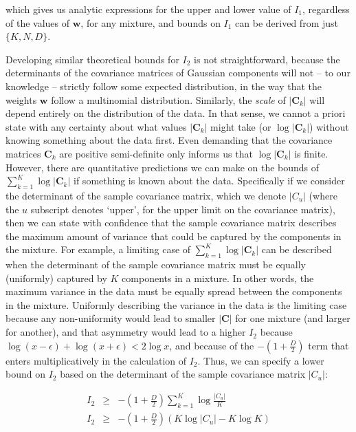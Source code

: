 \documentclass{elsarticle}
\newcommand{\vect}[1]{\boldsymbol{\mathbf{#1}}}
\renewcommand{\vec}[1]{\vect{#1}}
\def\cov{C}
\def\veccov{\vect{\cov}}
\def\weight{w}
\def\weights{\vect{\weight}}
\begin{document}
\noindent{}which gives us analytic expressions for the upper and lower value 
of $I_1$, regardless of the values of $\vec{\weight}$, for any mixture, and
bounds on $I_{1}$ can be derived from just $\{K, N, D\}$.


Developing similar theoretical bounds for $I_2$ is not straightforward, because
the determinants of the covariance matrices of Gaussian components will not
-- to our knowledge -- strictly follow some expected distribution, in the way 
that the weights $\weights$ follow a multinomial distribution. Similarly, the
\emph{scale} of $|\veccov_k|$ will depend entirely on the distribution of the
data. In that sense, we cannot a priori state with any certainty about what 
values $|\veccov_k|$ might take (or $\log{|\veccov_k|}$) without knowing
something about the data first. Even demanding that the covariance matrices
$\veccov_k$ are positive semi-definite only informs us that $\log{|\veccov_k|}$
is finite. However, there are quantitative predictions we can make on the 
bounds of $\sum_{k=1}^{K}\log{|\veccov_k|}$ if something is known about the
data. Specifically if we consider the determinant of the sample covariance 
matrix, which we denote $|\cov_{u}|$ (where the $u$ subscript denotes `upper',
for the upper limit on the covariance matrix), then we can state with confidence that
the sample covariance matrix describes the maximum amount of variance that 
could be captured by the components in the mixture. For example, a limiting
case of $\sum_{k=1}^{K}\log{|\veccov_k|}$ can be described when the determinant
of the sample covariance matrix must be equally (uniformly) captured by $K$ 
components in a mixture. In other words, the maximum variance in the data 
must be equally spread between the components in the mixture. Uniformly 
describing the variance in the data is the limiting case because any 
non-uniformity would lead to smaller $|\veccov|$ for one mixture (and larger 
for another), and that asymmetry would lead to a higher $I_2$ because 
$\log(x - \epsilon) + \log(x + \epsilon) < 2\log{x}$, and because of the 
$-(1 + \frac{D}{2})$ term that enters multiplicatively in the calculation of 
$I_2$. Thus, we can specify a lower bound on $I_2$ based on the determinant of
the sample covariance matrix $|\cov_{u}|$:

\begin{eqnarray}
    I_{2} & \geq & -\left(1 + \frac{D}{2}\right)\sum_{k=1}^{K}\log{\frac{|\cov_u|}{K}} \nonumber \\
    I_{2} & \geq & -\left(1 + \frac{D}{2}\right)\left(K\log{|\cov_u|} - K\log{K}\right) 
\end{eqnarray}
\end{document}

